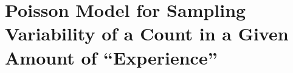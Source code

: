 \documentclass[10pt]{beamer}\usepackage[]{graphicx}\usepackage[]{color}
\begin{document}

\section{Poisson Model for Sampling Variability of a Count in a Given Amount of ``Experience''}
\end{document}
